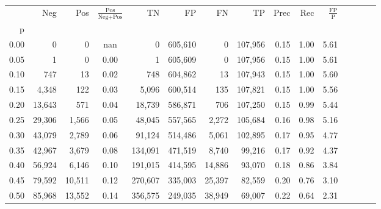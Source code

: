 \begin{tabular}{rrrcrrrrrrrrrrr}
\toprule
{} &     Neg &     Pos & $\frac{\text{Pos}}{\text{Neg}+\text{Pos}}$ &       TN &       FP &       FN &       TP &  Prec &   Rec & $\frac{\text{FP}}{\text{P}}$ \\
p    &         &         &                                            &          &          &          &          &       &       &                              \\
\midrule
0.00 &       0 &       0 &                                        nan &        0 &  605,610 &        0 &  107,956 &  0.15 &  1.00 &                         5.61 \\
0.05 &       1 &       0 &                                       0.00 &        1 &  605,609 &        0 &  107,956 &  0.15 &  1.00 &                         5.61 \\
0.10 &     747 &      13 &                                       0.02 &      748 &  604,862 &       13 &  107,943 &  0.15 &  1.00 &                         5.60 \\
0.15 &   4,348 &     122 &                                       0.03 &    5,096 &  600,514 &      135 &  107,821 &  0.15 &  1.00 &                         5.56 \\
0.20 &  13,643 &     571 &                                       0.04 &   18,739 &  586,871 &      706 &  107,250 &  0.15 &  0.99 &                         5.44 \\
0.25 &  29,306 &   1,566 &                                       0.05 &   48,045 &  557,565 &    2,272 &  105,684 &  0.16 &  0.98 &                         5.16 \\
0.30 &  43,079 &   2,789 &                                       0.06 &   91,124 &  514,486 &    5,061 &  102,895 &  0.17 &  0.95 &                         4.77 \\
0.35 &  42,967 &   3,679 &                                       0.08 &  134,091 &  471,519 &    8,740 &   99,216 &  0.17 &  0.92 &                         4.37 \\
0.40 &  56,924 &   6,146 &                                       0.10 &  191,015 &  414,595 &   14,886 &   93,070 &  0.18 &  0.86 &                         3.84 \\
0.45 &  79,592 &  10,511 &                                       0.12 &  270,607 &  335,003 &   25,397 &   82,559 &  0.20 &  0.76 &                         3.10 \\
0.50 &  85,968 &  13,552 &                                       0.14 &  356,575 &  249,035 &   38,949 &   69,007 &  0.22 &  0.64 &                         2.31 \\

\end{tabular}
